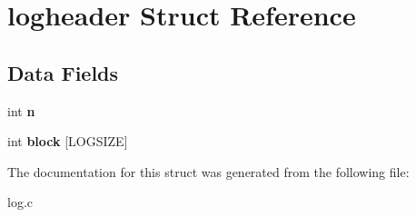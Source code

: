 \hypertarget{structlogheader}{}\section{logheader Struct Reference}
\label{structlogheader}
\subsection*{Data Fields}
\begin{DoxyCompactItemize}
\item 
int {\bfseries n}\hypertarget{structlogheader_a50b276b70d44ae77497ef1d71d182875}{}\label{structlogheader_a50b276b70d44ae77497ef1d71d182875}

\item 
int {\bfseries block} \mbox{[}L\+O\+G\+S\+I\+ZE\mbox{]}\hypertarget{structlogheader_a020db7fe04c7ce6b8f4aee2092576c2c}{}\label{structlogheader_a020db7fe04c7ce6b8f4aee2092576c2c}

\end{DoxyCompactItemize}


The documentation for this struct was generated from the following file\+:\begin{DoxyCompactItemize}
\item 
log.\+c\end{DoxyCompactItemize}
